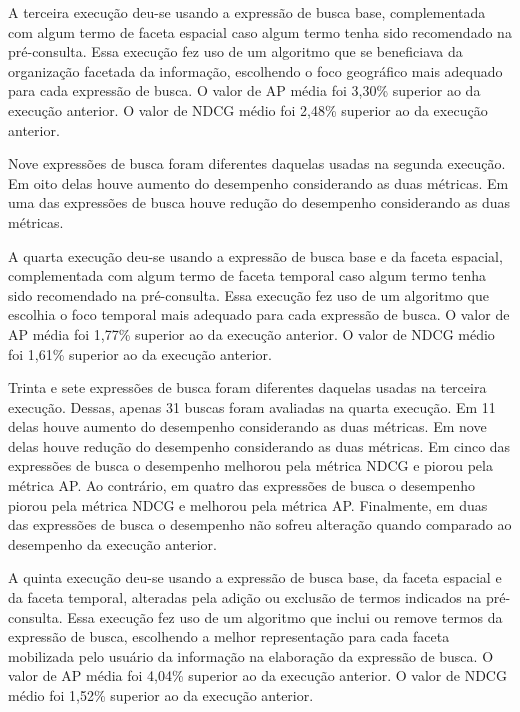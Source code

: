 A terceira execução deu-se usando a expressão de busca base, complementada com algum termo de faceta espacial caso algum termo tenha sido recomendado na pré-consulta. Essa execução fez uso de um algoritmo que se beneficiava da organização facetada da informação, escolhendo o foco geográfico mais adequado para cada expressão de busca. O valor de AP média foi 3,30\% superior ao da execução anterior. O valor de NDCG médio foi 2,48\% superior ao da execução anterior. 

Nove expressões de busca foram diferentes daquelas usadas na segunda execução. Em oito delas houve aumento do desempenho considerando as duas métricas. Em uma das expressões de busca houve redução do desempenho considerando as duas métricas.

A quarta execução deu-se usando a expressão de busca base e da faceta espacial, complementada com algum termo de faceta temporal caso algum termo tenha sido recomendado na pré-consulta. Essa execução fez uso de um algoritmo que escolhia o foco temporal mais adequado para cada expressão de busca. O valor de AP média foi 1,77\% superior ao da execução anterior. O valor de NDCG médio foi 1,61\% superior ao da execução anterior. 

Trinta e sete expressões de busca foram diferentes daquelas usadas na terceira execução. Dessas, apenas 31 buscas foram avaliadas na quarta execução. Em 11 delas houve aumento do desempenho considerando as duas métricas. Em nove delas houve redução do desempenho considerando as duas métricas. Em cinco das expressões de busca o desempenho melhorou pela métrica NDCG e piorou pela métrica AP. Ao contrário, em quatro das expressões de busca o desempenho piorou pela métrica NDCG e melhorou pela métrica AP. Finalmente, em duas das expressões de busca o desempenho não sofreu alteração quando comparado ao desempenho da execução anterior.

A quinta execução deu-se usando a expressão de busca base, da faceta espacial e da faceta temporal, alteradas pela adição ou exclusão de termos indicados na pré-consulta. Essa execução fez uso de um algoritmo que inclui ou remove termos da expressão de busca, escolhendo a melhor representação para cada faceta mobilizada pelo usuário da informação na elaboração da expressão de busca. O valor de AP média foi 4,04\% superior ao da execução anterior. O valor de NDCG médio foi 1,52\% superior ao da execução anterior.

